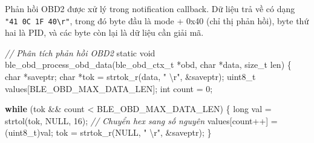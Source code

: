 \documentclass[a4paper]{extarticle}
\newenvironment{Shaded}{}{}
\newcommand{\CommentTok}[1]{\textcolor[rgb]{0.38,0.63,0.69}{\textit{#1}}}
\newcommand{\ControlFlowTok}[1]{\textcolor[rgb]{0.00,0.44,0.13}{\textbf{#1}}}
\newcommand{\DataTypeTok}[1]{\textcolor[rgb]{0.56,0.13,0.00}{#1}}
\newcommand{\DecValTok}[1]{\textcolor[rgb]{0.25,0.63,0.44}{#1}}
\newcommand{\NormalTok}[1]{#1}
\newcommand{\OperatorTok}[1]{\textcolor[rgb]{0.40,0.40,0.40}{#1}}
\newcommand{\SpecialCharTok}[1]{\textcolor[rgb]{0.25,0.44,0.63}{#1}}
\newcommand{\StringTok}[1]{\textcolor[rgb]{0.25,0.44,0.63}{#1}}
\begin{document}
Phản hồi OBD2 được xử lý trong notification callback. Dữ liệu trả về có
dạng \texttt{"41\ 0C\ 1F\ 40\textbackslash{}r"}, trong đó byte đầu là
mode + 0x40 (chỉ thị phản hồi), byte thứ hai là PID, và các byte còn lại
là dữ liệu cần giải mã.

\begin{Shaded}
\begin{Highlighting}[]
\CommentTok{// Phân tích phản hồi OBD2}
\DataTypeTok{static} \DataTypeTok{void}\NormalTok{ ble\_obd\_process\_obd\_data}\OperatorTok{(}\NormalTok{ble\_obd\_ctx\_t }\OperatorTok{*}\NormalTok{obd}\OperatorTok{,}
                                      \DataTypeTok{char} \OperatorTok{*}\NormalTok{data}\OperatorTok{,} \DataTypeTok{size\_t}\NormalTok{ len}\OperatorTok{)}
\OperatorTok{\{}
    \DataTypeTok{char} \OperatorTok{*}\NormalTok{saveptr}\OperatorTok{;}
    \DataTypeTok{char} \OperatorTok{*}\NormalTok{tok }\OperatorTok{=}\NormalTok{ strtok\_r}\OperatorTok{(}\NormalTok{data}\OperatorTok{,} \StringTok{" }\SpecialCharTok{\textbackslash{}r}\StringTok{"}\OperatorTok{,} \OperatorTok{\&}\NormalTok{saveptr}\OperatorTok{);}
    \DataTypeTok{uint8\_t}\NormalTok{ values}\OperatorTok{[}\NormalTok{BLE\_OBD\_MAX\_DATA\_LEN}\OperatorTok{];}
    \DataTypeTok{int}\NormalTok{ count }\OperatorTok{=} \DecValTok{0}\OperatorTok{;}

    \ControlFlowTok{while} \OperatorTok{(}\NormalTok{tok }\OperatorTok{\&\&}\NormalTok{ count }\OperatorTok{\textless{}}\NormalTok{ BLE\_OBD\_MAX\_DATA\_LEN}\OperatorTok{)} \OperatorTok{\{}
        \DataTypeTok{long}\NormalTok{ val }\OperatorTok{=}\NormalTok{ strtol}\OperatorTok{(}\NormalTok{tok}\OperatorTok{,}\NormalTok{ NULL}\OperatorTok{,} \DecValTok{16}\OperatorTok{);}  \CommentTok{// Chuyển hex sang số nguyên}
\NormalTok{        values}\OperatorTok{[}\NormalTok{count}\OperatorTok{++]} \OperatorTok{=} \OperatorTok{(}\DataTypeTok{uint8\_t}\OperatorTok{)}\NormalTok{val}\OperatorTok{;}
\NormalTok{        tok }\OperatorTok{=}\NormalTok{ strtok\_r}\OperatorTok{(}\NormalTok{NULL}\OperatorTok{,} \StringTok{" }\SpecialCharTok{\textbackslash{}r}\StringTok{"}\OperatorTok{,} \OperatorTok{\&}\NormalTok{saveptr}\OperatorTok{);}
    \OperatorTok{\}}


\end{Highlighting}
\end{Shaded}
\end{document}
